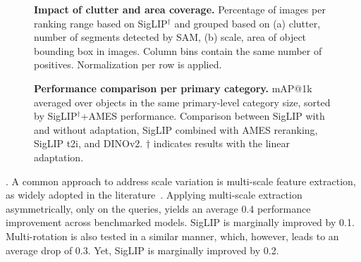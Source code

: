 \begin{figure}[t]
    \centering
    \vspace{-12pt}
    \caption{\textbf{Impact of clutter and area coverage.} Percentage of images per ranking range based on SigLIP$^\dagger$ and grouped based on (a) clutter, \ie number of segments detected by SAM, (b) scale, \ie area of object bounding box in images. Column bins contain the same number of positives. Normalization per row is applied.
    \label{fig:heatmaps_scale}
    \vspace{-13pt}
    }
\end{figure}

\begin{figure*}[t]
    \centering
    \scalebox{1.}{
       
    }
    \vspace{-11pt}
    \caption{\textbf{Performance comparison per primary category.} mAP@1k  averaged over objects in the same primary-level category size, sorted by SigLIP$^\dagger$+AMES performance. Comparison between SigLIP with and without adaptation, SigLIP combined with AMES reranking, SigLIP t2i, and DINOv2. $\dagger$ indicates results with the linear adaptation.
    \label{fig:performance_barplot}
    \vspace{-10pt}
    }
\end{figure*}

. 
A common approach to address scale variation is multi-scale feature extraction, as widely adopted in the literature~\cite{rtc19,sck+23}.
Applying multi-scale extraction asymmetrically, \ie only on the queries, yields an average 0.4 performance improvement across benchmarked models. SigLIP is marginally improved by 0.1. Multi-rotation is also tested in a similar manner, which, however, leads to an average drop of 0.3. Yet, SigLIP is marginally improved by 0.2.

